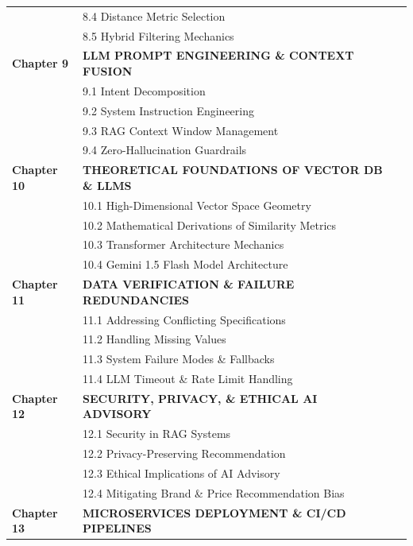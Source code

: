 \documentclass[12pt,a4paper]{article}
\begin{document}
\begin{longtable}{@{} p{2.2cm} p{11.8cm} r @{}}
& 8.4 Distance Metric Selection & \pageref{sec:8.4} \\[3pt]
& 8.5 Hybrid Filtering Mechanics & \pageref{sec:8.5} \\[6pt]
\textbf{Chapter 9} & \textbf{LLM PROMPT ENGINEERING \& CONTEXT FUSION} & \pageref{chap:9} \\[4pt]
& 9.1 Intent Decomposition & \pageref{sec:9.1} \\[3pt]
& 9.2 System Instruction Engineering & \pageref{sec:9.2} \\[3pt]
& 9.3 RAG Context Window Management & \pageref{sec:9.3} \\[3pt]
& 9.4 Zero-Hallucination Guardrails & \pageref{sec:9.4} \\[6pt]
\textbf{Chapter 10} & \textbf{THEORETICAL FOUNDATIONS OF VECTOR DB \& LLMS} & \pageref{chap:10} \\[4pt]
& 10.1 High-Dimensional Vector Space Geometry & \pageref{sec:10.1} \\[3pt]
& 10.2 Mathematical Derivations of Similarity Metrics & \pageref{sec:10.2} \\[3pt]
& 10.3 Transformer Architecture Mechanics & \pageref{sec:10.3} \\[3pt]
& 10.4 Gemini 1.5 Flash Model Architecture & \pageref{sec:10.4} \\[6pt]
\textbf{Chapter 11} & \textbf{DATA VERIFICATION \& FAILURE REDUNDANCIES} & \pageref{chap:11} \\[4pt]
& 11.1 Addressing Conflicting Specifications & \pageref{sec:11.1} \\[3pt]
& 11.2 Handling Missing Values & \pageref{sec:11.2} \\[3pt]
& 11.3 System Failure Modes \& Fallbacks & \pageref{sec:11.3} \\[3pt]
& 11.4 LLM Timeout \& Rate Limit Handling & \pageref{sec:11.4} \\[6pt]
\textbf{Chapter 12} & \textbf{SECURITY, PRIVACY, \& ETHICAL AI ADVISORY} & \pageref{chap:12} \\[4pt]
& 12.1 Security in RAG Systems & \pageref{sec:12.1} \\[3pt]
& 12.2 Privacy-Preserving Recommendation & \pageref{sec:12.2} \\[3pt]
& 12.3 Ethical Implications of AI Advisory & \pageref{sec:12.3} \\[3pt]
& 12.4 Mitigating Brand \& Price Recommendation Bias & \pageref{sec:12.4} \\[6pt]
\textbf{Chapter 13} & \textbf{MICROSERVICES DEPLOYMENT \& CI/CD PIPELINES} & \pageref{chap:13} \\[4pt]

\end{longtable}
\end{document}
